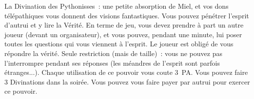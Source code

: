 \documentclass[14pt,twocolumn]{extarticle}
\begin{document}
La Divination des Pythonisses~: une petite absorption de Miel, et vos dons
télépathiques vous donnent des visions fantastiques. Vous pouvez pénétrer
l'esprit d'autrui et y lire la Vérité. En terme de jeu, vous devez prendre à
part un autre joueur (devant un organisateur), et vous pouvez, pendant une
minute, lui poser toutes les questions qui vous viennent à l'esprit. Le joueur
est obligé de vous répondre la vérité. Seule restriction (mais de taille)~:
vous ne pouvez pas l'interrompre pendant ses réponses (les méandres de l'esprit
sont parfois étranges...). Chaque utilisation de ce pouvoir vous coute 3~PA.
Vous pouvez faire 3 Divinations dans la soirée. Vous pouvez vous faire payer
par autrui pour exercer ce pouvoir.
\end{document}
